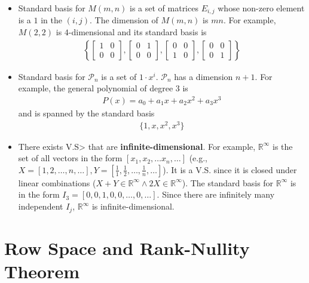 \begin{itemize}
  \item Standard basis for $M(m, n)$ is a set of matrices $E_{i, j}$ whose non-zero element is a $1$ in the $(i, j)$.
    The dimension of $M(m, n)$ is $mn$.
    For example, $M(2, 2)$ is $4$-dimensional and its standard basis is
    \begin{align*}
      \left\{
        \begin{bmatrix}
          1 & 0\\ 0 & 0
        \end{bmatrix},
        \begin{bmatrix}
          0 & 1\\ 0 & 0
        \end{bmatrix},
        \begin{bmatrix}
          0 & 0\\ 1 & 0
        \end{bmatrix},
        \begin{bmatrix}
          0 & 0\\ 0 & 1
        \end{bmatrix}
      \right\}
    \end{align*}
  \item Standard basis for $\mathcal{P}_n$ is a set of $1 \cdot x^i$.
    $\mathcal{P}_n$ has a dimension $n + 1$.
    For example, the general polynomial of degree $3$ is
    \begin{align*}
      P(x) = a_0 + a_1 x + a_2 x^2 + a_3 x^3
    \end{align*}
    and is spanned by the standard basis
    \begin{align*}
      \{ 1, x, x^2, x^3 \}
    \end{align*}
  \item There exists V.S> that are \textbf{infinite-dimensional}.
    For example, $\mathbb{R}^\infty$ is the set of all vectors in the form $[ x_1, x_2, \ldots x_n, \ldots]$ (e.g., $X = [1, 2, \ldots, n, \ldots], Y = [ \frac{1}{1}, \frac{1}{2}, \ldots, \frac{1}{n}, \ldots]$).
    It is a V.S. since it is closed under linear combinations ($X + Y \in \mathbb{R}^\infty \land 2X \in \mathbb{R}^\infty$).
    The standard basis for $\mathbb{R}^\infty$ is in the form $I_3 = [0, 0, 1, 0, 0, \ldots, 0, \ldots]$.
    Since there are infinitely many independent $I_j$, $\mathbb{R}^\infty$ is infinite-dimensional.
\end{itemize}

\section{Row Space and Rank-Nullity Theorem}

